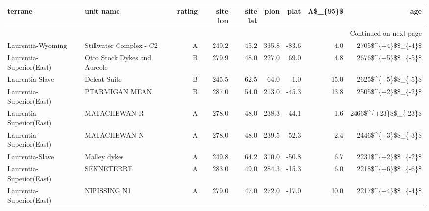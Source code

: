 \begin{longtable}{p{1 in}p{1 in}rrrrrrr}
\toprule
                       terrane &                                          unit name & rating &  site lon &  site lat &  plon &  plat &  A\$\_\{95\}\$ &                    age \\
\midrule
\endhead
\midrule
\multicolumn{9}{r}{{Continued on next page}} \\
\midrule
\endfoot

\bottomrule
\endlastfoot
             Laurentia-Wyoming &                            Stillwater Complex - C2 &      A &     249.2 &      45.2 & 335.8 & -83.6 &       4.0 &     2705\$\textasciicircum \{+4\}\$\$\_\{-4\}\$ \\
      Laurentia-Superior(East) &                       Otto Stock Dykes and Aureole &      B &     279.9 &      48.0 & 227.0 &  69.0 &       4.8 &     2676\$\textasciicircum \{+5\}\$\$\_\{-5\}\$ \\
               Laurentia-Slave &                                       Defeat Suite &      B &     245.5 &      62.5 &  64.0 &  -1.0 &      15.0 &     2625\$\textasciicircum \{+5\}\$\$\_\{-5\}\$ \\
      Laurentia-Superior(East) &                                     PTARMIGAN MEAN &      B &     287.0 &      54.0 & 213.0 & -45.3 &      13.8 &     2505\$\textasciicircum \{+2\}\$\$\_\{-2\}\$ \\
      Laurentia-Superior(East) &                                       MATACHEWAN R &      A &     278.0 &      48.0 & 238.3 & -44.1 &       1.6 &   2466\$\textasciicircum \{+23\}\$\$\_\{-23\}\$ \\
      Laurentia-Superior(East) &                                       MATACHEWAN N &      A &     278.0 &      48.0 & 239.5 & -52.3 &       2.4 &     2446\$\textasciicircum \{+3\}\$\$\_\{-3\}\$ \\
               Laurentia-Slave &                                       Malley dykes &      A &     249.8 &      64.2 & 310.0 & -50.8 &       6.7 &     2231\$\textasciicircum \{+2\}\$\$\_\{-2\}\$ \\
      Laurentia-Superior(East) &                                         SENNETERRE &      A &     283.0 &      49.0 & 284.3 & -15.3 &       6.0 &     2218\$\textasciicircum \{+6\}\$\$\_\{-6\}\$ \\
      Laurentia-Superior(East) &                                       NIPISSING N1 &      A &     279.0 &      47.0 & 272.0 & -17.0 &      10.0 &     2217\$\textasciicircum \{+4\}\$\$\_\{-4\}\$ \\

\end{longtable}
